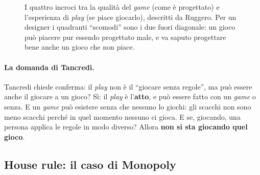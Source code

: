\begin{figure}[htbp]
\centering
{}
\caption{I quattro incroci tra la qualità del \emph{game} (come è progettato) e
l'esperienza di \emph{play} (se piace giocarlo), descritti da Ruggero. Per un
designer i quadranti ``scomodi'' sono i due fuori diagonale: un gioco può
piacere pur essendo progettato male, e va saputo progettare bene anche un gioco
che non piace.}
\label{a1:fig:quadranti}
\end{figure}

\paragraph{La domanda di Tancredi.} Tancredi chiede conferma: il \emph{play}
non è il ``giocare senza regole'', ma può essere anche il giocare a un gioco? Sì:
il \emph{play} è l'\textbf{atto}, e può essere fatto con un \emph{game} o senza.
E un \emph{game} può esistere senza che nessuno lo giochi: gli scacchi non sono
meno scacchi perché in quel momento nessuno ci gioca. E se, giocando, una
persona applica le regole in modo diverso? Allora \textbf{non si sta giocando
quel gioco}.

\subsection{House rule: il caso di Monopoly}

